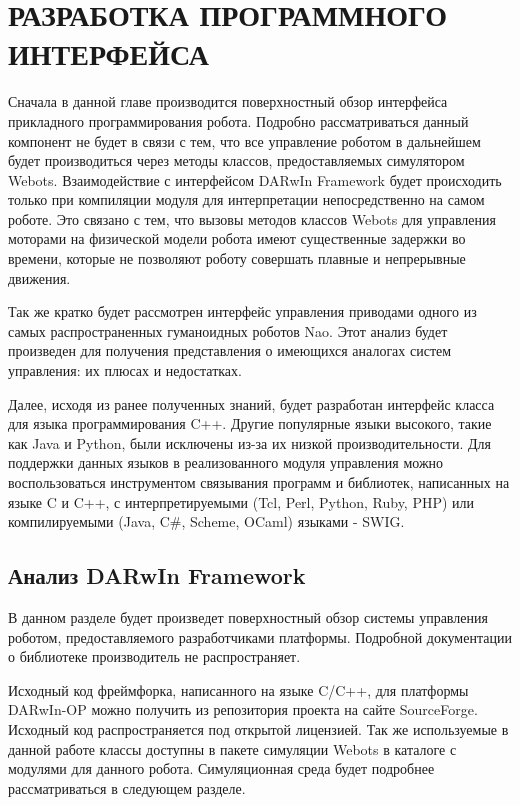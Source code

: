 \chapter{РАЗРАБОТКА ПРОГРАММНОГО ИНТЕРФЕЙСА}

Сначала в данной главе производится поверхностный обзор интерфейса прикладного программирования робота. Подробно рассматриваться данный компонент не будет в связи с тем, что все управление роботом в дальнейшем будет производиться через методы классов, предоставляемых симулятором Webots. Взаимодействие с интерфейсом DARwIn Framework будет происходить только при компиляции модуля для интерпретации непосредственно на самом роботе. Это связано с тем, что вызовы методов классов Webots для управления моторами на физической модели робота имеют существенные задержки во времени, которые не позволяют роботу совершать плавные и непрерывные движения.

Так же кратко будет рассмотрен интерфейс управления приводами одного из самых распространенных гуманоидных роботов Nao. Этот анализ будет произведен для получения представления о имеющихся аналогах систем управления: их плюсах и недостатках.

Далее, исходя из ранее полученных знаний, будет разработан интерфейс класса для языка программирования C++. Другие популярные языки высокого, такие как Java и Python, были исключены из-за их низкой производительности. Для поддержки данных языков в реализованного модуля управления можно воспользоваться инструментом связывания программ и библиотек, написанных на языке C и C++, с интерпретируемыми (Tcl, Perl, Python, Ruby, PHP) или компилируемыми (Java, C\#, Scheme, OCaml) языками - SWIG.


\section{Анализ DARwIn Framework}

В данном разделе будет произведет поверхностный обзор системы управления роботом, предоставляемого разработчиками платформы. Подробной документации о библиотеке производитель не распространяет.

Исходный код фреймфорка, написанного на языке C/C++, для платформы DARwIn-OP можно получить из репозитория проекта на сайте SourceForge. Исходный код распространяется под открытой лицензией. Так же используемые в данной работе классы доступны в пакете симуляции Webots в каталоге с модулями для данного робота. Симуляционная среда будет подробнее рассматриваться в следующем разделе.

